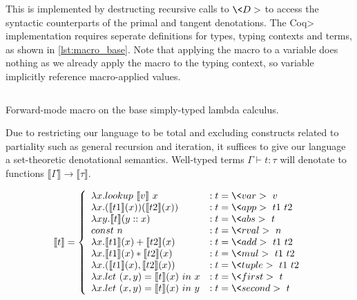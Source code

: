 \documentclass[11pt, final]{article}
\begin{document}
  This is implemented by destructing recursive calls to $\<D>$ to access the syntactic counterparts of the primal and tangent denotations.
  The \<Coq> implementation requires seperate definitions for types, typing contexts and terms, as shown in \ref{lst:macro_base}.
  Note that applying the macro to a variable does nothing as we already apply the macro to the typing context, so variable implicitly reference macro-applied values.

  \begin{listing}
    \begin{verbatim}
    \end{verbatim}
    \caption{Forward-mode macro on the base simply-typed lambda calculus.}
    \label{lst:macro_base}
  \end{listing}

  Due to restricting our language to be total and excluding constructs related to partiality such as general recursion and iteration, it suffices to give our language a set-theoretic denotational semantics. Well-typed terms $\Gamma \vdash t : \tau$ will denotate to functions $\llbracket \Gamma \rrbracket \rightarrow \llbracket \tau \rrbracket$.

  \begin{equation}
    \llbracket t \rrbracket =
      \left\{
        \begin{array}{ll}
          \lambda x. lookup\ \llbracket v \rrbracket\ x
            & : t = \<var>\ v \\
          \lambda x. (\llbracket t1 \rrbracket(x)) (\llbracket t2 \rrbracket(x))
            & : t = \<app>\ t1\ t2 \\
          \lambda x y. \llbracket t \rrbracket(y :: x)
            & : t = \<abs>\ t \\
          const\ n
            & : t = \<rval>\ n \\
          \lambda x. \llbracket t1 \rrbracket(x) + \llbracket t2 \rrbracket(x)
            & : t = \<add>\ t1\ t2 \\
          \lambda x. \llbracket t1 \rrbracket(x) * \llbracket t2 \rrbracket(x)
            & : t = \<mul>\ t1\ t2 \\
          \lambda x. (\llbracket t1 \rrbracket(x), \llbracket t2 \rrbracket(x))
            & : t = \<tuple>\ t1\ t2 \\
          \lambda x. let\ (x, y) = \llbracket t \rrbracket(x)\ in\ x
            & : t = \<first>\ t \\
          \lambda x. let\ (x, y) = \llbracket t \rrbracket(x)\ in\ y
            & : t = \<second>\ t \\
        \end{array}
      \right.
  \label{eqn:lr_base}
  \end{equation}
\end{document}
